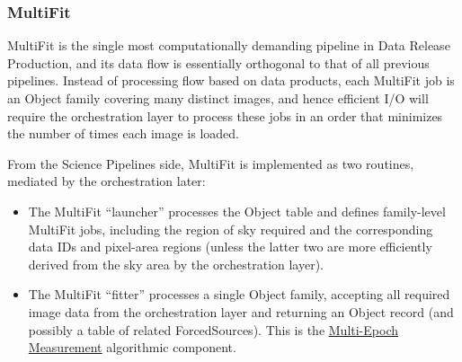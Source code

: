 \subsubsection{MultiFit}
\label{sec:drpMultiFit}

MultiFit is the single most computationally demanding pipeline in Data Release Production, and its data flow is essentially orthogonal to that of all previous pipelines.  Instead of processing flow based on data products, each MultiFit job is an Object family covering many distinct images, and hence efficient I/O will require the orchestration layer to process these jobs in an order that minimizes the number of times each image is loaded.

From the Science Pipelines side, MultiFit is implemented as two routines, mediated by the orchestration later:
\begin{itemize}
\item The MultiFit ``launcher'' processes the Object table and defines family-level MultiFit jobs, including the region of sky required and the corresponding data IDs and pixel-area regions (unless the latter two are more efficiently derived from the sky area by the orchestration layer).
\item The MultiFit ``fitter'' processes a single Object family, accepting all required image data from the orchestration layer and returning an Object record (and possibly a table of related ForcedSources).  This is the \hyperref[sec:acMultiEpochMeasurement]{Multi-Epoch Measurement} algorithmic component.
\end{itemize}

